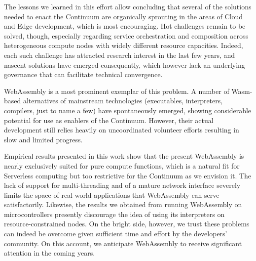 The lessons we learned in this effort allow concluding that several of the solutions needed to enact the Continuum are organically sprouting in the areas of Cloud and Edge development, which is most encouraging. 
Hot challenges remain to be solved, though, especially regarding service orchestration and composition across heterogeneous compute nodes with widely different resource capacities. 
Indeed, each such challenge has attracted research interest in the last few years, and nascent solutions have emerged consequently, which however lack an underlying governance that can facilitate technical convergence.

WebAssembly is a most prominent exemplar of this problem.
A number of Wasm-based alternatives of mainstream technologies (executables, interpreters, compilers, just to name a few) have spontaneously emerged, showing considerable potential for use as enablers of the Continuum. 
However, their actual development still relies heavily on uncoordinated volunteer efforts resulting in slow and limited progress.

Empirical results presented in this work show that the present WebAssembly is nearly exclusively suited for pure compute functions, which is a natural fit for  Serverless computing but too restrictive for the Continuum as we envision it.
The lack of support for multi-threading and of a mature network interface severely limits the space of real-world applications that WebAssembly can serve satisfactorily.
Likewise, the results we obtained from running WebAssembly on microcontrollers presently discourage the idea of using its interpreters on resource-constrained nodes. 
On the bright side, however, we trust these problems can indeed be overcome given sufficient time and effort by the developers' community. 
On this account, we anticipate WebAssembly to receive significant attention in the coming years.



